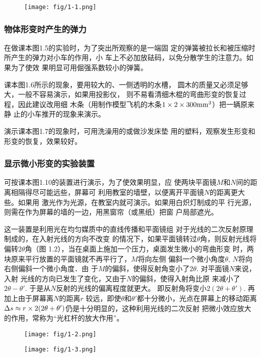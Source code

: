 \begin{figure}[htp]
    \centering
\texttt{[image: fig/1-1.png]}
    \caption{}
\end{figure}


\subsubsection{物体形变时产生的弹力}
在做课本图1.5的实验时，为了突出所观察的是一端固
定的弹簧被拉长和被压缩时所产生的弹力对小车的作用，小
车上不必加放砝码，以免分散学生的注意力。如果为了使效
果明显可用倔强系数较小的弹簧。

课本图1.6所示的现象，要用较大的、一侧透明的水槽，
圆木的质量又必须足够大，一般不容易演示，如果用投影仪，
则不易看清细木棍的弯曲形变的恢复过程，因此建议改用细
木条（用制作模型飞机的木条$1\times2\times300 {\rm mm}^3$）把一辆原来静
止的小车推开的现象来演示。

演示课本图1.7的现象时，可用洗澡用的或做沙发床垫
用的塑料，观察发生形变和形变的恢复，效果较好。

\subsubsection{显示微小形变的实验装置}
可按课本图1.10的装置进行演示，为了使效果明显，应
使两块平面镜$M$和$N$间的距离相隔得尽可能远些，屏幕可
利用教室的墙壁，以便离开平面镜$N$的距离更大些。如果用
激光作为光源，在教室内就可演示。如果用白炽灯制成的平
行光源，则需在作为屏幕的墙的一边，用黑窗帘（或黑纸）把窗
户局部遮光。

这一装置是利用光在均匀媒质中的直线传播和平面镜组
对于光线的二次反射原理制成的，在入射光线的方向不改变
的情况下，如果平面镜转过$\theta$角，则反射光线将偏转$2\theta$角（图
1.2），当在桌面上施加一个压力，桌面发生微小的弯曲形变
时，两块原来平行放置的平面镜就不再平行了，$M$将向左侧
偏斜一个微小角度$\theta$, $N$将向右侧偏斜一个微小角度．由
于$M$的偏斜，使得反射角变小了$2\theta$. 对平面镜$N$来说，入射
光线的方向已发生了变化，又由于$N$的偏斜，使得入射角比原
来减小了$2\theta- \theta'$. 于是从$N$反射的光线的偏离程度就更大。
即反射角将变小$2(2\theta+\theta')$. 再加上由于屏幕离$N$的距离$r$
较远，即使$\theta$和$\theta'$都十分微小，光点在屏幕上的移动距离$\Delta s\approx r\times 2(2\theta+\theta')$仍是十分明显的，这种利用光线的二次反射
把微小效应放大的作用，常称为“光杠杆的放大作用”。
\begin{figure}[htp]\centering
    \begin{minipage}[t]{0.48\textwidth}
    \centering
\texttt{[image: fig/1-2.png]}
    \caption{}
    \end{minipage}
    \begin{minipage}[t]{0.48\textwidth}
    \centering
    \texttt{[image: fig/1-3.png]}
    \caption{}
    \end{minipage}
    \end{figure}

